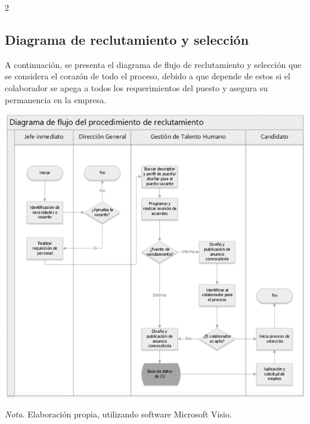 \documentclass[12pt,spanish,Letterpaper,openany]{book}
\begin{document}
\begin {multicols}{2}
\hypertarget{diagrama-de-reclutamiento-y-selecciuxf3n}{%
\subsection{Diagrama de reclutamiento y selección}\label{diagrama-de-reclutamiento-y-selecciuxf3n}}

A continuación, se presenta el diagrama de flujo de reclutamiento y selección que se considera el corazón de todo el proceso, debido a que depende de estos si el colaborador se apega a todos los requerimientos del puesto y asegura su permanencia en la empresa.

\begin {flushleft}
\noindent\begin{minipage}[c]{\columnwidth}

\textbf{}

\begin{center}\includegraphics[width=0.8\linewidth]{imagenes_articulos/art05_02} \end{center}

\emph{Nota.} Elaboración propia, utilizando software Microsoft Visio.

\end{minipage}
\end {flushleft}

\begin {flushleft}
\noindent\begin{minipage}[c]{\columnwidth}

\textbf{}


\end{minipage}
\end{flushleft}
\end{multicols}
\end{document}
